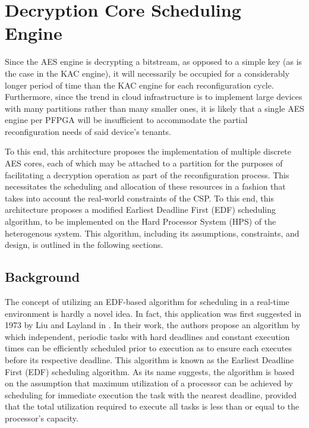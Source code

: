 
\chapter{Decryption Core Scheduling Engine}\label{ch:edfScheduling}

Since the AES engine is decrypting a bitstream, as opposed to a simple key (as is the case in the KAC engine), it will necessarily be occupied for a considerably longer period of time than the KAC engine for each reconfiguration cycle. Furthermore, since the trend in cloud infrastructure is to implement large devices with many partitions rather than many smaller ones, it is likely that a single AES engine per PFPGA will be insufficient to accommodate the partial reconfiguration needs of said device's tenants.

To this end, this architecture proposes the implementation of multiple discrete AES cores, each of which may be attached to a partition for the purposes of facilitating a decryption operation as part of the reconfiguration process. This necessitates the scheduling and allocation of these resources in a fashion that takes into account the real-world constraints of the CSP. To this end, this architecture proposes a modified Earliest Deadline First (EDF) scheduling algorithm, to be implemented on the Hard Processor System (HPS) of the heterogenous system. This algorithm, including its assumptions, constraints, and design, is outlined in the following sections.

\section{Background}\label{sec:EDFRelated}

The concept of utilizing an EDF-based algorithm for scheduling in a real-time environment is hardly a novel idea. In fact, this application was first suggested in 1973 by Liu and Layland in \cite{liu_scheduling_1973}. In their work, the authors propose an algorithm by which independent, periodic tasks with hard deadlines and constant execution times can be efficiently scheduled prior to execution as to ensure each executes before its respective deadline. This algorithm is known as the Earliest Deadline First (EDF) scheduling algorithm. As its name suggests, the algorithm is based on the assumption that maximum utilization of a processor can be achieved by scheduling for immediate execution the task with the nearest deadline, provided that the total utilization required to execute all tasks is less than or equal to the processor's capacity.

